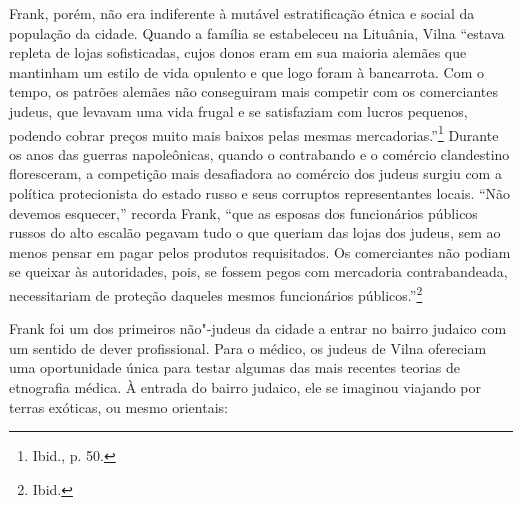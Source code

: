Frank, porém, não era indiferente à mutável estratificação étnica e
social da população da cidade. Quando a família se estabeleceu na
Lituânia, Vilna ``estava repleta de lojas sofisticadas, cujos donos eram
em sua maioria alemães que mantinham um estilo de vida opulento e que
logo foram à bancarrota. Com o tempo, os patrões alemães não conseguiram
mais competir com os comerciantes judeus, que levavam uma vida frugal e
se satisfaziam com lucros pequenos, podendo cobrar preços muito mais
baixos pelas mesmas mercadorias.''\footnote{Ibid., p. 50.} Durante os
anos das guerras napoleônicas, quando o contrabando e o comércio
clandestino floresceram, a competição mais desafiadora ao comércio dos
judeus surgiu com a política protecionista do estado russo e seus
corruptos representantes locais. ``Não devemos esquecer,'' recorda
Frank, ``que as esposas dos funcionários públicos russos do alto escalão
pegavam tudo o que queriam das lojas dos judeus, sem ao menos pensar em
pagar pelos produtos requisitados. Os comerciantes não podiam se queixar
às autoridades, pois, se fossem pegos com mercadoria contrabandeada,
necessitariam de proteção daqueles mesmos funcionários
públicos.''\footnote{Ibid.}

Frank foi um dos primeiros não"-judeus da cidade a entrar no bairro
judaico com um sentido de dever profissional. Para o médico, os judeus
de Vilna ofereciam uma oportunidade única para testar algumas das mais
recentes teorias de etnografia médica. À entrada do bairro judaico, ele
se imaginou viajando por terras exóticas, ou mesmo orientais:

